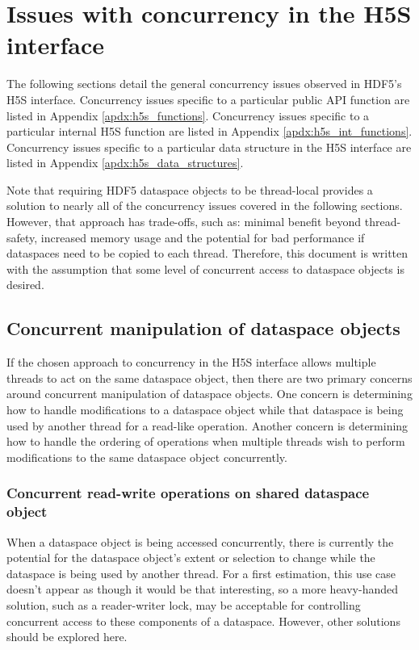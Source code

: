 \documentclass[../HDF5_RFC.tex]{subfiles}
\begin{document}
\section{Issues with concurrency in the H5S interface}
\label{h5s_concurrency}

The following sections detail the general concurrency issues observed in HDF5's H5S
interface. Concurrency issues specific to a particular public API function are listed in
Appendix \ref{apdx:h5s_functions}. Concurrency issues specific to a particular internal
H5S function are listed in Appendix \ref{apdx:h5s_int_functions}. Concurrency issues
specific to a particular data structure in the H5S interface are listed in Appendix
\ref{apdx:h5s_data_structures}.

Note that requiring HDF5 dataspace objects to be thread-local provides a solution to
nearly all of the concurrency issues covered in the following sections. However, that
approach has trade-offs, such as: minimal benefit beyond thread-safety, increased memory
usage and the potential for bad performance if dataspaces need to be copied to each
thread. Therefore, this document is written with the assumption that some level of
concurrent access to dataspace objects is desired.

\subsection{Concurrent manipulation of dataspace objects}
\label{h5s_concurrent_manipulation}

If the chosen approach to concurrency in the H5S interface allows multiple threads to
act on the same dataspace object, then there are two primary concerns around concurrent
manipulation of dataspace objects. One concern is determining how to handle modifications
to a dataspace object while that dataspace is being used by another thread for a read-like
operation. Another concern is determining how to handle the ordering of operations when
multiple threads wish to perform modifications to the same dataspace object concurrently.

\subsubsection{Concurrent read-write operations on shared dataspace object}
\label{h5s_concurrent_readwrite}

When a dataspace object is being accessed concurrently, there is currently the potential for
the dataspace object's extent or selection to change while the dataspace is being used by
another thread. For a first estimation, this use case doesn't appear as though it would
be that interesting, so a more heavy-handed solution, such as a reader-writer lock, may be
acceptable for controlling concurrent access to these components of a dataspace. However,
other solutions should be explored here.
\end{document}
